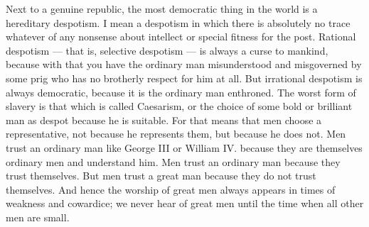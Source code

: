 Next to a genuine republic, the most democratic thing in the world is a hereditary despotism. I mean a despotism in which there is absolutely no trace whatever of any nonsense about intellect or special fitness for the post. Rational despotism — that is, selective despotism — is always a curse to mankind, because with that you have the ordinary man misunderstood and misgoverned by some prig who has no brotherly respect for him at all. But irrational despotism is always democratic, because it is the ordinary man enthroned. The worst form of slavery is that which is called Caesarism, or the choice of some bold or brilliant man as despot because he is suitable. For that means that men choose a representative, not because he represents them, but because he does not. Men trust an ordinary man like George III or William IV. because they are themselves ordinary men and understand him. Men trust an ordinary man because they trust themselves. But men trust a great man because they do not trust themselves. And hence the worship of great men always appears in times of weakness and cowardice; we never hear of great men until the time when all other men are small.

